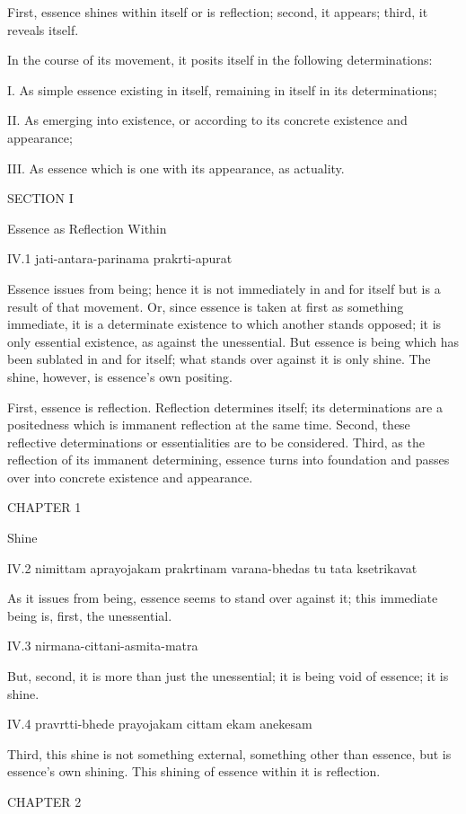 First, essence shines within itself or is reflection;
second, it appears;
third, it reveals itself.

In the course of its movement,
it posits itself in the following determinations:

I. As simple essence existing in itself,
remaining in itself in its determinations;

II. As emerging into existence,
or according to its concrete existence and appearance;

III. As essence which is one with its appearance,
as actuality.

SECTION I

Essence as Reflection Within

IV.1
jati-antara-parinama prakrti-apurat

Essence issues from being;
hence it is not immediately in and for itself
but is a result of that movement.
Or, since essence is taken at first as something immediate,
it is a determinate existence to which another stands opposed;
it is only essential existence, as against the unessential.
But essence is being which has been sublated in and for itself;
what stands over against it is only shine.
The shine, however, is essence's own positing.

First, essence is reflection.
Reflection determines itself;
its determinations are a positedness
which is immanent reflection at the same time.
Second, these reflective determinations
or essentialities are to be considered.
Third, as the reflection of its immanent determining,
essence turns into foundation and passes over
into concrete existence and appearance.

CHAPTER 1

Shine

IV.2
nimittam aprayojakam prakrtinam varana-bhedas tu tata ksetrikavat

As it issues from being, essence seems to stand over against it;
this immediate being is, first, the unessential.

IV.3
nirmana-cittani-asmita-matra

But, second, it is more than just the unessential;
it is being void of essence; it is shine.

IV.4
pravrtti-bhede prayojakam cittam ekam anekesam

Third, this shine is not something external,
something other than essence, but is essence's own shining.
This shining of essence within it is reflection.

CHAPTER 2

